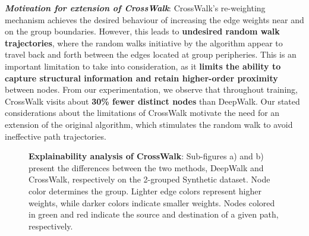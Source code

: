 \textbf{\textit{Motivation for extension of CrossWalk}}: CrossWalk's re-weighting mechanism achieves the desired behaviour of increasing the edge weights near and on the group boundaries. However, this leads to \textbf{undesired random walk trajectories}, where the random walks initiative by the algorithm appear to travel back and forth between the edges located at group peripheries. This is an important limitation to take into consideration, as it \textbf{limits the ability to capture structural information and retain higher-order proximity} between nodes. From our experimentation, we observe that throughout training, CrossWalk visits about \textbf{30\% fewer distinct nodes} than DeepWalk. Our stated considerations about the limitations of CrossWalk motivate the need for an extension of the original algorithm, which stimulates the random walk to avoid ineffective path trajectories.


\begin{figure}[h]
    \hfill
    \caption{\textbf{Explainability analysis of CrossWalk}: Sub-figures a) and b) present the differences between the two methods, DeepWalk and CrossWalk, respectively on the 2-grouped Synthetic dataset. Node color determines the group. Lighter edge colors represent higher weights, while darker colors indicate smaller weights. Nodes colored in green and red indicate the source and destination of a given path, respectively.}
    \label{fig:beyond-crosswalk-visualisation}
\end{figure}

